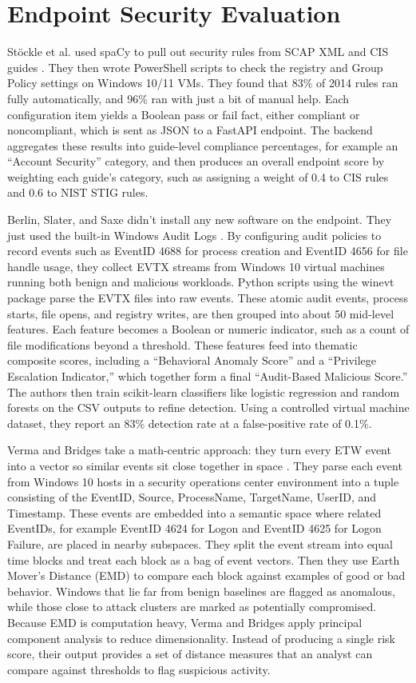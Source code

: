 \documentclass[conference, letterpaper]{IEEEtran}
\begin{document}
    \section{Endpoint Security Evaluation}
    Stöckle et al. used spaCy to pull out security rules from SCAP XML and CIS guides \cite{b1}. They then wrote PowerShell scripts to check the registry and Group Policy settings on Windows 10/11 VMs. They found that 83\% of 2014 rules ran fully automatically, and 96\% ran with just a bit of manual help. Each configuration item yields a Boolean pass or fail fact, either compliant or noncompliant, which is sent as JSON to a FastAPI endpoint. The backend aggregates these results into guide-level compliance percentages, for example an “Account Security” category, and then produces an overall endpoint score by weighting each guide's category, such as assigning a weight of 0.4 to CIS rules and 0.6 to NIST STIG rules.

    Berlin, Slater, and Saxe didn't install any new software on the endpoint. They just used the built-in Windows Audit Logs \cite{b2}. By configuring audit policies to record events such as EventID 4688 for process creation and EventID 4656 for file handle usage, they collect EVTX streams from Windows 10 virtual machines running both benign and malicious workloads. Python scripts using the winevt package parse the EVTX files into raw events. These atomic audit events, process starts, file opens, and registry writes, are then grouped into about 50 mid-level features. Each feature becomes a Boolean or numeric indicator, such as a count of file modifications beyond a threshold. These features feed into thematic composite scores, including a “Behavioral Anomaly Score” and a “Privilege Escalation Indicator,” which together form a final “Audit-Based Malicious Score.” The authors then train scikit-learn classifiers like logistic regression and random forests on the CSV outputs to refine detection. Using a controlled virtual machine dataset, they report an 83\% detection rate at a false-positive rate of 0.1\%.

    Verma and Bridges take a math-centric approach: they turn every ETW event into a vector so similar events sit close together in space \cite{b3}. They parse each event from Windows 10 hosts in a security operations center environment into a tuple consisting of the EventID, Source, ProcessName, TargetName, UserID, and Timestamp. These events are embedded into a semantic space where related EventIDs, for example EventID 4624 for Logon and EventID 4625 for Logon Failure, are placed in nearby subspaces. They split the event stream into equal time blocks and treat each block as a bag of event vectors. Then they use Earth Mover's Distance (EMD) to compare each block against examples of good or bad behavior. Windows that lie far from benign baselines are flagged as anomalous, while those close to attack clusters are marked as potentially compromised. Because EMD is computation heavy, Verma and Bridges apply principal component analysis to reduce dimensionality. Instead of producing a single risk score, their output provides a set of distance measures that an analyst can compare against thresholds to flag suspicious activity.
\end{document}
